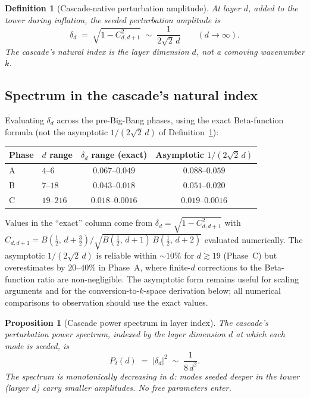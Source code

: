 \documentclass[12pt,a4paper]{article}
\newtheorem{proposition}[theorem]{Proposition}
\newtheorem{definition}[theorem]{Definition}
\begin{document}
\begin{definition}[Cascade-native perturbation amplitude]\label{def:gram-amp}
At layer $d$, added to the tower during inflation, the seeded perturbation
amplitude is
\[
\delta_d \;=\; \sqrt{1 - C_{d,d+1}^2}
\;\sim\; \frac{1}{2\sqrt{2}\,d} \qquad (d \to \infty).
\]
The cascade's natural index is the layer dimension $d$, not a comoving
wavenumber $k$.
\end{definition}

\subsection{Spectrum in the cascade's natural index}

Evaluating $\delta_d$ across the pre-Big-Bang phases, using the exact
Beta-function formula (not the asymptotic $1/(2\sqrt{2}\,d)$ of
Definition~\ref{def:gram-amp}):

\begin{center}
\renewcommand{\arraystretch}{1.25}
\begin{tabular}{llcc}
\toprule
Phase & $d$ range & $\delta_d$ range (exact) & Asymptotic $1/(2\sqrt{2}\,d)$ \\
\midrule
A & $4$--$6$ & $0.067$--$0.049$ & $0.088$--$0.059$ \\
B & $7$--$18$ & $0.043$--$0.018$ & $0.051$--$0.020$ \\
C & $19$--$216$ & $0.018$--$0.0016$ & $0.019$--$0.0016$ \\
\bottomrule
\end{tabular}
\end{center}

Values in the ``exact'' column come from
$\delta_d = \sqrt{1 - C_{d,d+1}^2}$ with
$C_{d,d+1} = B(\tfrac{1}{2},\,d+\tfrac{3}{2}) / \sqrt{B(\tfrac{1}{2},\,d+1)\,B(\tfrac{1}{2},\,d+2)}$
evaluated numerically. The asymptotic $1/(2\sqrt{2}\,d)$ is reliable within
$\sim 10\%$ for $d \gtrsim 19$ (Phase~C) but overestimates by $20$--$40\%$
in Phase~A, where finite-$d$ corrections to the Beta-function ratio are
non-negligible. The asymptotic form remains useful for scaling arguments
and for the conversion-to-$k$-space derivation below; all numerical
comparisons to observation should use the exact values.

\begin{proposition}[Cascade power spectrum in layer index]\label{prop:dspectrum}
The cascade's perturbation power spectrum, indexed by the layer dimension $d$
at which each mode is seeded, is
\[
P_\delta(d) \;=\; |\delta_d|^2 \;\sim\; \frac{1}{8\,d^2}.
\]
The spectrum is monotonically decreasing in $d$: modes seeded deeper in the
tower (larger $d$) carry smaller amplitudes. No free parameters enter.
\end{proposition}
\end{document}
